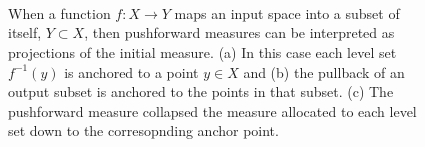 \documentclass[
  letterpaper,
  DIV=11,
  numbers=noendperiod]{scrartcl}
\begin{document}
\begin{figure}
\begin{minipage}[t]{0.30\linewidth}
{{}

}

\subcaption{\label{fig-pullback-sets}}
\end{minipage}%
%
\begin{minipage}[t]{0.20\linewidth}

{\centering 

~

}

\end{minipage}%
\newline
\begin{minipage}[t]{0.05\linewidth}

{\centering 

~

}

\end{minipage}%
%
\begin{minipage}[t]{0.90\linewidth}

{\centering 


}

\subcaption{\label{fig-marginal-probability}}
\end{minipage}%
%
\begin{minipage}[t]{0.05\linewidth}

{\centering 

~

}

\end{minipage}%

\caption{\label{fig-projection}When a function \(f: X \rightarrow Y\)
maps an input space into a subset of itself, \(Y \subset X\), then
pushforward measures can be interpreted as projections of the initial
measure. (a) In this case each level set \(f^{-1}(y)\) is anchored to a
point \(y \in X\) and (b) the pullback of an output subset is anchored
to the points in that subset. (c) The pushforward measure collapsed the
measure allocated to each level set down to the corresopnding anchor
point.}

\end{figure}
\end{document}
